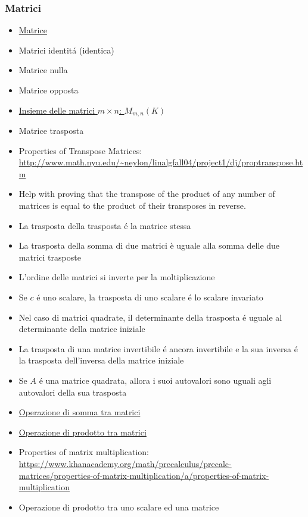 \subsubsection{Matrici}
\begin{itemize}
   \item \href{Matrice.pdf}{Matrice}
   \item Matrici identit\'{a} (identica)
   \item Matrice nulla
   \item Matrice opposta 
   \item \href{InsiemeDelleMatrici.pdf}{Insieme delle matrici $m \times n$: $M_{m,n}(K)$}
   \item Matrice trasposta
   \item Properties of Transpose Matrices: \url{http://www.math.nyu.edu/~neylon/linalgfall04/project1/dj/proptranspose.htm}
   \item Help with proving that the transpose of the product of any number of matrices is equal to the product of their transposes in reverse.
   \item La trasposta della trasposta \'{e} la matrice stessa
   \item La trasposta della somma di due matrici è uguale alla somma delle due matrici trasposte
   \item L'ordine delle matrici si inverte per la moltiplicazione
   \item Se $c$ \'{e} uno scalare, la trasposta di uno scalare \'{e} lo scalare invariato
   \item Nel caso di matrici quadrate, il determinante della trasposta \'{e} uguale al determinante della matrice iniziale
   \item La trasposta di una matrice invertibile \'{e} ancora invertibile e la sua inversa \'{e} la trasposta dell'inversa della matrice iniziale
   \item Se $A$ \'{e} una matrice quadrata, allora i suoi autovalori sono uguali agli autovalori della sua trasposta
   \item \href{SommaMatrici.pdf}{Operazione di somma tra matrici}
   \item \href{ProdottoMatrici.pdf}{Operazione di prodotto tra matrici}
   \item Properties of matrix multiplication: \url{https://www.khanacademy.org/math/precalculus/precalc-matrices/properties-of-matrix-multiplication/a/properties-of-matrix-multiplication}
   \item Operazione di prodotto tra uno scalare ed una matrice

\end{itemize}
